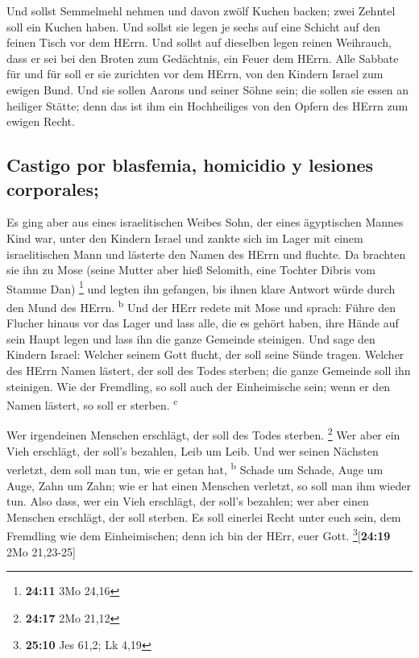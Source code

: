  Und sollst Semmelmehl nehmen und davon zwölf Kuchen
backen; zwei Zehntel soll ein Kuchen haben.  Und sollst
sie legen je sechs auf eine Schicht auf den feinen Tisch vor dem HErrn.
 Und sollst auf dieselben legen reinen Weihrauch, dass er
sei bei den Broten zum Gedächtnis, ein Feuer dem HErrn. 
Alle Sabbate für und für soll er sie zurichten vor dem HErrn, von den
Kindern Israel zum ewigen Bund.  Und sie sollen Aarons und
seiner Söhne sein; die sollen sie essen an heiliger Stätte; denn das ist
ihm ein Hochheiliges von den Opfern des HErrn zum ewigen Recht.

\hypertarget{castigo-por-blasfemia-homicidio-y-lesiones-corporales}{%
\subsection{Castigo por blasfemia, homicidio y lesiones
corporales;}\label{castigo-por-blasfemia-homicidio-y-lesiones-corporales}}

 Es ging aber aus eines israelitischen Weibes Sohn, der
eines ägyptischen Mannes Kind war, unter den Kindern Israel und zankte
sich im Lager mit einem israelitischen Mann  und lästerte
den Namen des HErrn und fluchte. Da brachten sie ihn zu Mose (seine
Mutter aber hieß Selomith, eine Tochter Dibris vom Stamme Dan)
\footnote{\textbf{24:11} 3Mo 24,16}  und legten ihn
gefangen, bis ihnen klare Antwort würde durch den Mund des HErrn.
\textsuperscript{b}  Und der HErr redete mit Mose und
sprach:  Führe den Flucher hinaus vor das Lager und lass
alle, die es gehört haben, ihre Hände auf sein Haupt legen und lass ihn
die ganze Gemeinde steinigen.  Und sage den Kindern
Israel: Welcher seinem Gott flucht, der soll seine Sünde tragen.
 Welcher des HErrn Namen lästert, der soll des Todes
sterben; die ganze Gemeinde soll ihn steinigen. Wie der Fremdling, so
soll auch der Einheimische sein; wenn er den Namen lästert, so soll er
sterben. \textsuperscript{c}

 Wer irgendeinen Menschen erschlägt, der soll des Todes
sterben. \footnote{\textbf{24:17} 2Mo 21,12}  Wer aber
ein Vieh erschlägt, der soll's bezahlen, Leib um Leib. 
Und wer seinen Nächsten verletzt, dem soll man tun, wie er getan hat,
\textsuperscript{b}  Schade um Schade, Auge um Auge, Zahn
um Zahn; wie er hat einen Menschen verletzt, so soll man ihm wieder tun.
 Also dass, wer ein Vieh erschlägt, der soll's bezahlen;
wer aber einen Menschen erschlägt, der soll sterben.  Es
soll einerlei Recht unter euch sein, dem Fremdling wie dem
Einheimischen; denn ich bin der HErr, euer Gott.
\footnote{\textbf{25:10} Jes 61,2; Lk 4,19}{[}\textbf{24:19} 2Mo
21,23-25{]}

